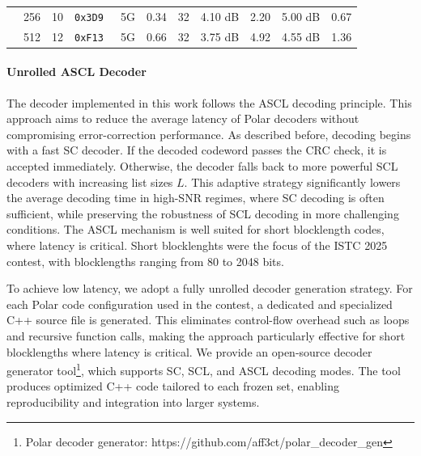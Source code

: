 \documentclass[11pt]{report}
\begin{document}
\begin{table}[h]
{{\begin{tabular}{c r r l c c r r r r r}
                                 & 256 & 10                                      & \texttt{0x3D9 }             & 5G       & 0.34                                & 32                                  & 4.10 dB   & 2.20                              & 5.00 dB   & 0.67                              \\
                                 & 512 & 12                                      & \texttt{0xF13 }             & 5G       & 0.66                                & 32                                  & 3.75 dB   & 4.92                              & 4.55 dB   & 1.36                              \\

          \bottomrule
        \end{tabular}
      }}
\end{table}

\paragraph{Unrolled ASCL Decoder}
\label{unrolled}
The decoder implemented in this work follows the ASCL decoding principle. This approach aims to reduce the average latency of Polar decoders without compromising error-correction performance. As described before, decoding begins with a fast SC decoder. If the decoded codeword passes the CRC check, it is accepted immediately. Otherwise, the decoder falls back to more powerful SCL decoders with increasing list sizes $L$. This adaptive strategy significantly lowers the average decoding time in high-SNR regimes, where SC decoding is often sufficient, while preserving the robustness of SCL decoding in more challenging conditions. The ASCL mechanism is well suited for short blocklength codes, where latency is critical. Short blocklenghts were the focus of the ISTC 2025 contest, with blocklengths ranging from 80 to 2048 bits.

To achieve low latency, we adopt a fully unrolled decoder generation strategy. For each Polar code configuration used in the contest, a dedicated and specialized C++ source file is generated. This eliminates control-flow overhead such as loops and recursive function calls, making the approach particularly effective for short blocklengths where latency is critical.
We provide an open-source decoder generator tool\footnote{Polar decoder generator: https://github.com/aff3ct/polar\_decoder\_gen}, which supports SC, SCL, and ASCL decoding modes. The tool produces optimized C++ code tailored to each frozen set, enabling reproducibility and integration into larger systems.
\end{document}
